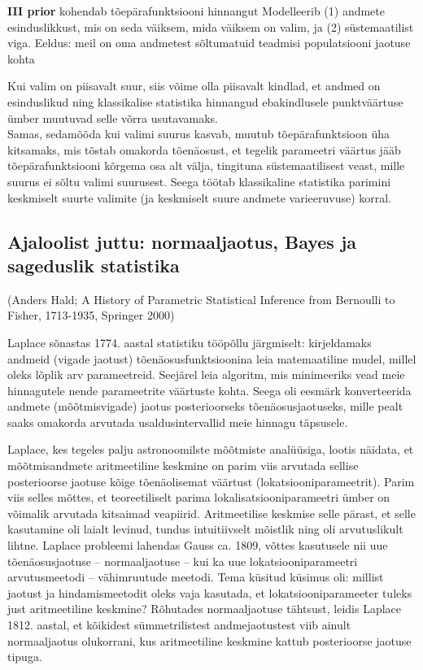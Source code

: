 \documentclass[]{book}
\begin{document}
\textbf{III prior} kohendab tõepärafunktsiooni hinnangut
Modelleerib (1) andmete esinduslikkust, mis on seda väiksem, mida väiksem on valim, ja (2) süstemaatilist viga.
Eeldus: meil on oma andmetest sõltumatuid teadmisi populatsiooni jaotuse kohta

Kui valim on piisavalt suur, siis võime olla piisavalt kindlad, et andmed on esinduslikud ning klassikalise statistika hinnangud ebakindlusele punktväärtuse ümber muutuvad selle võrra usutavamaks.\\
Samas, sedamõõda kui valimi suurus kasvab, muutub tõepärafunktsioon üha kitsamaks, mis tõstab omakorda tõenäosust, et tegelik parameetri väärtus jääb tõepärafunktsiooni kõrgema osa alt välja, tingituna süstemaatilisest veast, mille suurus ei sõltu valimi suurusest. Seega töötab klassikaline statistika parimini keskmiselt suurte valimite (ja keskmiselt suure andmete varieeruvuse) korral.

\hypertarget{ajaloolist-juttu-normaaljaotus-bayes-ja-sageduslik-statistika}{%
\subsection{Ajaloolist juttu: normaaljaotus, Bayes ja sageduslik statistika}\label{ajaloolist-juttu-normaaljaotus-bayes-ja-sageduslik-statistika}}

(Anders Hald; A History of Parametric Statistical Inference from Bernoulli to Fisher, 1713-1935, Springer 2000)

Laplace sõnastas 1774. aastal statistiku tööpõllu järgmiselt: kirjeldamaks andmeid (vigade jaotust) tõenäosusfunktsioonina leia matemaatiline mudel, millel oleks lõplik arv parameetreid. Seejärel leia algoritm, mis minimeeriks vead meie hinnagutele nende parameetrite väärtuste kohta. Seega oli eesmärk konverteerida andmete (mõõtmisvigade) jaotus posterioorseks tõenäosusjaotuseks, mille pealt saaks omakorda arvutada usaldusintervallid meie hinnagu täpsusele.

Laplace, kes tegeles palju astronoomilste mõõtmiste analüüsiga, lootis näidata, et mõõtmisandmete aritmeetiline keskmine on parim viis arvutada sellise posterioorse jaotuse kõige tõenäolisemat väärtust (lokatsiooniparameetrit).
Parim viis selles mõttes, et teoreetiliselt parima lokalisatsiooniparameetri ümber on võimalik arvutada kitsaimad veapiirid.
Aritmeetilise keskmise selle pärast, et selle kasutamine oli laialt levinud, tundus intuitiivselt mõistlik ning oli arvutuslikult lihtne. Laplace probleemi lahendas Gauss ca. 1809, võttes kasutusele nii uue tõenäosusjaotuse -- normaaljaotuse -- kui ka uue lokatsiooniparameetri arvutusmeetodi -- vähimruutude meetodi. Tema küsitud küsimus oli: millist jaotust ja hindamismeetodit oleks vaja kasutada, et lokatsiooniparameeter tuleks just aritmeetiline keskmine?
Rõhutades normaaljaotuse tähtsust, leidis Laplace 1812. aastal, et kõikidest sümmetrilistest andmejaotustest viib ainult normaaljaotus olukorrani, kus aritmeetiline keskmine kattub posterioorse jaotuse tipuga.
\end{document}
